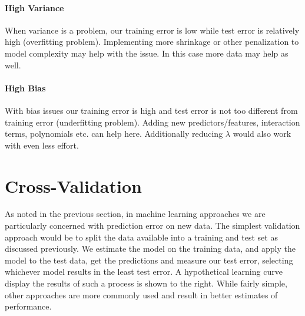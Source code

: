 \documentclass[english,nohyper,titlepage]{tufte-handout}
\begin{document}
\subsection{High Variance}
When variance is a problem, our training error is low while test error is relatively high (overfitting problem). Implementing more shrinkage or other penalization to model complexity may help with the issue.  In this case more data may help as well.

\subsection{High Bias}
With bias issues our training error is high and test error is not too different from training error (underfitting problem).  Adding new predictors/features, interaction terms, polynomials etc. can help here.  Additionally reducing $\lambda$ would also work with even less effort.







\part{Cross-Validation}
As noted in the previous section, in machine learning approaches we are particularly concerned with prediction error on new data.  The simplest validation approach would be to split the data available into a training and test set as discussed previously.  We estimate the model on the training data, and apply the model to the test data, get the predictions and measure our test error, selecting whichever model results in the least test error.  A hypothetical learning curve display the results of such a process is shown to the right. While fairly simple, other approaches are more commonly used and result in better estimates of performance.
\end{document}
